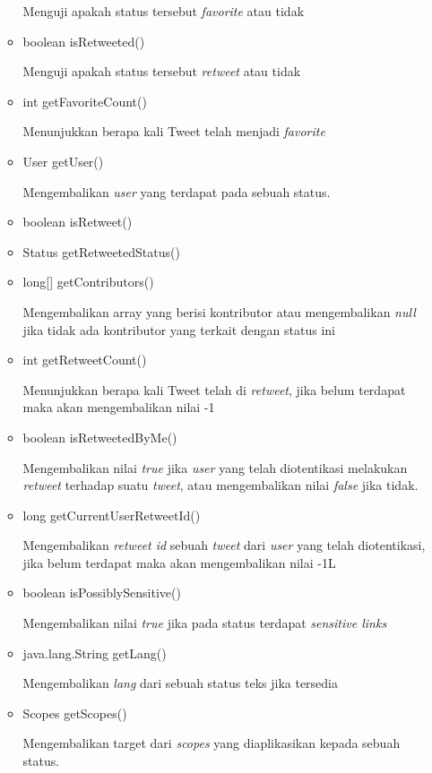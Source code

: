 \begin{itemize}
\begin{itemize}
			Menguji apakah status tersebut \textit{favorite} atau tidak
			\item boolean isRetweeted()
			
			Menguji apakah status tersebut \textit{retweet} atau tidak
			\item int getFavoriteCount()
			
			Menunjukkan berapa kali Tweet telah menjadi \textit{favorite}
			\item User getUser()
			
			Mengembalikan \textit{user} yang terdapat pada sebuah status.
			\item boolean isRetweet()
			\item Status getRetweetedStatus()
			\item long[] getContributors()
			
			Mengembalikan array yang berisi kontributor atau mengembalikan \textit{null} jika tidak ada kontributor yang terkait dengan status ini
			\item int getRetweetCount()
			
			Menunjukkan berapa kali Tweet telah di \textit{retweet}, jika belum terdapat maka akan mengembalikan nilai -1
			\item boolean isRetweetedByMe()
			
			Mengembalikan nilai \textit{true} jika \textit{user} yang telah diotentikasi melakukan \textit{retweet} terhadap suatu \textit{tweet}, atau mengembalikan nilai \textit{false} jika tidak.
			\item long getCurrentUserRetweetId()
			
			Mengembalikan \textit{retweet id} sebuah \textit{tweet} dari \textit{user} yang telah diotentikasi, jika belum terdapat maka akan mengembalikan nilai -1L
			\item boolean isPossiblySensitive()
			
			Mengembalikan nilai \textit{true} jika pada status terdapat \textit{sensitive links}
			\item java.lang.String getLang()
			
			Mengembalikan \textit{lang} dari sebuah status teks jika tersedia
			\item Scopes getScopes()
			
			Mengembalikan target dari \textit{scopes} yang diaplikasikan kepada sebuah status.
		\end{itemize}
	\end{itemize}
	
